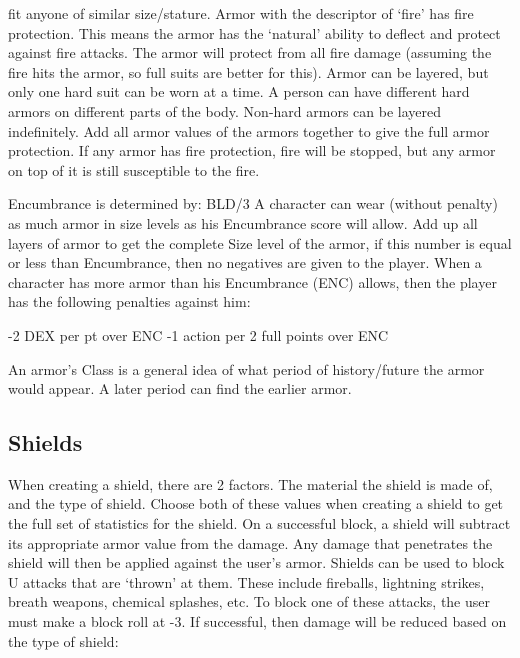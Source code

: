 \documentclass[twoside]{book}
\begin{document}
                 fit anyone of similar size/stature. 
                  Armor with the descriptor of `fire'
                 has fire protection. This means the armor has the
                 `natural' ability to deflect and protect
                 against fire attacks. The armor will protect from all
                 fire damage (assuming the fire hits the armor, so full
                 suits are better for this). 
                  Armor can be layered, but only one hard suit can
                 be worn at a time. A person can have different hard
                 armors on different parts of the body. Non-hard armors
                 can be layered indefinitely. Add all armor values of the
                 armors together to give the full armor protection. If
                 any armor has fire protection, fire will be stopped, but
                 any armor on top of it is still susceptible to the fire.
                 
                Encumbrance is determined by: BLD/3   
                  A character can wear (without penalty) as much
                 armor in size levels as his Encumbrance score will
                 allow. Add up all layers of armor to get the complete
                 Size level of the armor, if this number is equal or less
                 than Encumbrance, then no negatives are given to the
                 player. 
                 When a character has more armor than his
                Encumbrance (ENC) allows, then the player has the
                following penalties against him:
                  
                    -2 DEX per pt over ENC   
                    -1 action per 2 full points over ENC   
                  
                
                  An armor's Class is a general idea of what
                 period of history/future the armor would appear. A later
                 period can find the earlier armor. 
            
\subsection{Shields}
      
                  When creating a shield, there are 2 factors. The
                 material the shield is made of, and the type of shield.
                 Choose both of these values when creating a shield to
                 get the full set of statistics for the shield. 
                  On a successful block, a shield will subtract its
                 appropriate armor value from the damage. Any damage that
                 penetrates the shield will then be applied against the
                 user's armor. 
                 Shields can be used to block U attacks that are
                `thrown' at them. These include fireballs,
                lightning strikes, breath weapons, chemical splashes,
                etc. To block one of these attacks, the user must make a
                block roll at -3. If successful, then damage will be
                reduced based on the type of shield:
                  
\end{document}
